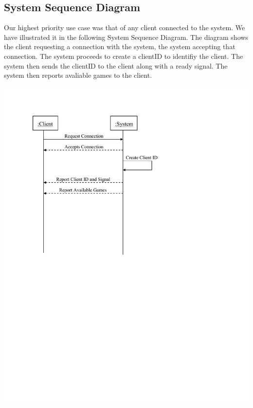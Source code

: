 \documentclass[letterpaper,12pt]{article}
\begin{document}
\subsection{System Sequence Diagram}
Our highest priority use case was that of any client connected to the system. We have illustrated it in the following System Sequence Diagram. The diagram shows the client requesting a connection with the system, the system accepting that connection. The system proceeds to create a clientID to identifiy the client. The system then sends the clientID to the client along with a ready signal. The system then reports avaliable games to the client. 
\begin{center}\includegraphics{SSD.pdf} \end{center} 
\end{document}

